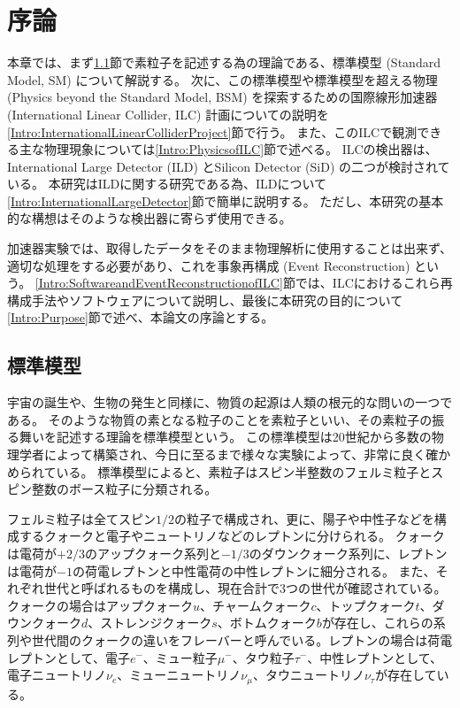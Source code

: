 
\chapter{序論} \label{chap:Introduction}

本章では、まず\ref{Intro:StandardModel}節で素粒子を記述する為の理論である、標準模型 (Standard Model, SM) について解説する。
次に、この標準模型や標準模型を超える物理 (Physics beyond the Standard Model, BSM) を探索するための国際線形加速器 (International Linear Collider, ILC) 計画についての説明を\ref{Intro:InternationalLinearColliderProject}節で行う。
また、このILCで観測できる主な物理現象については\ref{Intro:PhysicsofILC}節で述べる。
ILCの検出器は、International Large Detector (ILD) とSilicon Detector (SiD) の二つが検討されている。
本研究はILDに関する研究である為、ILDについて\ref{Intro:InternationalLargeDetector}節で簡単に説明する。
ただし、本研究の基本的な構想はそのような検出器に寄らず使用できる。

加速器実験では、取得したデータをそのまま物理解析に使用することは出来ず、適切な処理をする必要があり、これを事象再構成 (Event Reconstruction) という。
\ref{Intro:SoftwareandEventReconstructionofILC}節では、ILCにおけるこれら再構成手法やソフトウェアについて説明し、最後に本研究の目的について\ref{Intro:Purpose}節で述べ、本論文の序論とする。

\section{標準模型} \label{Intro:StandardModel}

宇宙の誕生や、生物の発生と同様に、物質の起源は人類の根元的な問いの一つである。
そのような物質の素となる粒子のことを素粒子といい、その素粒子の振る舞いを記述する理論を標準模型という。
この標準模型は20世紀から多数の物理学者によって構築され、今日に至るまで様々な実験によって、非常に良く確かめられている。
標準模型によると、素粒子はスピン半整数のフェルミ粒子とスピン整数のボース粒子に分類される。

フェルミ粒子は全てスピン$1/2$の粒子で構成され、更に、陽子や中性子などを構成するクォークと電子やニュートリノなどのレプトンに分けられる。
クォークは電荷が$+2/3$のアップクォーク系列と$-1/3$のダウンクォーク系列に、レプトンは電荷が$-1$の荷電レプトンと中性電荷の中性レプトンに細分される。
また、それぞれ世代と呼ばれるものを構成し、現在合計で3つの世代が確認されている。
クォークの場合はアップクォーク$u$、チャームクォーク$c$、トップクォーク$t$、ダウンクォーク$d$、ストレンジクォーク$s$、ボトムクォーク$b$が存在し、これらの系列や世代間のクォークの違いをフレーバーと呼んでいる。レプトンの場合は荷電レプトンとして、電子$e^-$、ミュー粒子$\mu^-$、タウ粒子$\tau^-$、中性レプトンとして、電子ニュートリノ$\nu_e$、ミューニュートリノ$\nu_{\mu}$、タウニュートリノ$\nu_{\tau}$が存在している。

